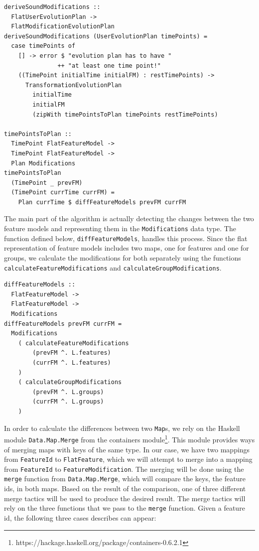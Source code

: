 \documentclass[a4paper,english]{ifimaster}
\begin{document}
\begin{verbatim}
deriveSoundModifications :: 
  FlatUserEvolutionPlan -> 
  FlatModificationEvolutionPlan
deriveSoundModifications (UserEvolutionPlan timePoints) = 
  case timePoints of
    [] -> error $ "evolution plan has to have " 
               ++ "at least one time point!"
    ((TimePoint initialTime initialFM) : restTimePoints) ->
      TransformationEvolutionPlan
        initialTime
        initialFM
        (zipWith timePointsToPlan timePoints restTimePoints)

timePointsToPlan ::
  TimePoint FlatFeatureModel -> 
  TimePoint FlatFeatureModel -> 
  Plan Modifications
timePointsToPlan 
  (TimePoint _ prevFM) 
  (TimePoint currTime currFM) =
    Plan currTime $ diffFeatureModels prevFM currFM
\end{verbatim}

The main part of the algorithm is actually detecting the changes between the two feature models and representing them in the \texttt{Modifications} data type. The function defined below, \texttt{diffFeatureModels}, handles this process. Since the flat representation of feature models includes two maps, one for features and one for groups, we calculate the modifications for both separately using the functions \texttt{calculateFeatureModifications} and \texttt{calculateGroupModifications}.

\begin{verbatim}
diffFeatureModels :: 
  FlatFeatureModel -> 
  FlatFeatureModel -> 
  Modifications
diffFeatureModels prevFM currFM =
  Modifications
    ( calculateFeatureModifications
        (prevFM ^. L.features)
        (currFM ^. L.features)
    )
    ( calculateGroupModifications
        (prevFM ^. L.groups)
        (currFM ^. L.groups)
    )
\end{verbatim}

In order to calculate the differences between two \texttt{Map}s, we rely on the Haskell module \texttt{Data.Map.Merge} from the containers module\footnote{https://hackage.haskell.org/package/containers-0.6.2.1}. This module provides ways of merging maps with keys of the same type. In our case, we have two mappings from \texttt{FeatureId} to \texttt{FlatFeature}, which we will attempt to merge into a mapping from \texttt{FeatureId} to \texttt{FeatureModification}. The merging will be done using the \texttt{merge} function from \texttt{Data.Map.Merge}, which will compare the keys, the feature ids, in both maps. Based on the result of the comparison, one of three different merge tactics will be used to produce the desired result. The merge tactics will rely on the three functions that we pass to the \texttt{merge} function. Given a feature id, the following three cases describes can appear:
\end{document}
